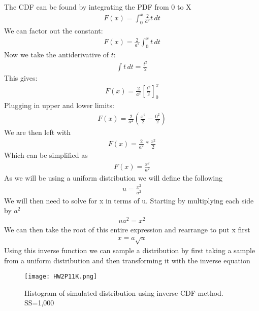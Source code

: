 \documentclass[final,11pt]{article}
\begin{document}
\begin{spacing}{1.25}
\begin{enumerate}
    The CDF can be found by integrating the PDF from 0 to X
    \begin{gather}
        F(x) = \int_{0}^{x} \frac{2}{a^2} t \, dt
    \end{gather}
    We can factor out the constant:
    \begin{gather}
        F(x) = \frac{2}{a^2} \int_{0}^{x} t \, dt
    \end{gather}
    Now we take the antiderivative of \( t \):
    \begin{gather}
        \int t \, dt = \frac{t^2}{2}
    \end{gather}
    This gives:
    \begin{gather}
        F(x) = \frac{2}{a^2} \left[ \frac{t^2}{2} \right]_0^x
    \end{gather}
    Plugging in upper and lower limits:
    \begin{gather}
        F(x) = \frac{2}{a^2} \left( \frac{x^2}{2} - \frac{0^2}{2} \right)
    \end{gather}
    We are then left with 
    \begin{gather}
        F(x) = \frac{2}{a^2} * \frac{x^2}{2}
    \end{gather}
    Which can be simplified as 
    \begin{gather}
        F(x) = \frac{x^2}{a^2}
    \end{gather}
    As we will be using a uniform distribution we will define the following 
    \begin{gather}
        u=\frac{x^2}{a^2}
    \end{gather}
    We will then need to solve for x in terms of u. Starting by multiplying each side by $a^2$
    \begin{gather}
        u a^2=x^2
    \end{gather}
    We can then take the root of this entire expression and rearrange to put x first 
    \begin{gather}
        x=a\sqrt{u}
    \end{gather}
    Using this inverse function we can sample a distribution by first taking a sample from a uniform distribution and then transforming it with the inverse equation
    \FloatBarrier
    \begin{figure}[h]
        \centering 
        \texttt{[image: HW2P11K.png]}
        \caption{Histogram of simulated distribution using inverse CDF method. SS=1,000}
        \label{fig:SS1000}
    \end{figure}
    \FloatBarrier

\end{enumerate}
\end{spacing}
\end{document}
